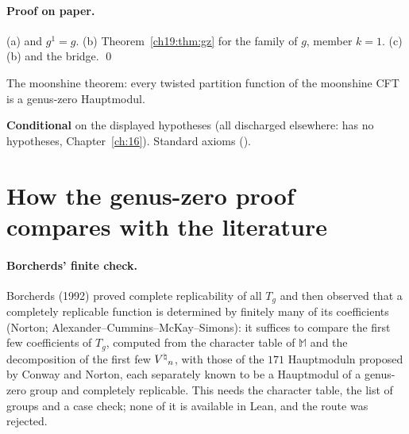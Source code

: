 \paragraph{Proof on paper.}  (a)  and $g^1=g$.  (b) Theorem~\ref{ch19:thm:gz} for the family of $g$, member
$k=1$.  (c) (b) and the bridge. \qed
\begin{physics}The moonshine theorem: every twisted partition function of the moonshine CFT is a genus-zero Hauptmodul.\end{physics}
\begin{status}\textbf{Conditional} on the displayed hypotheses (all discharged elsewhere:  has no hypotheses,
Chapter~\ref{ch:16}).  Standard axioms ().\end{status}

\section{How the genus-zero proof compares with the literature}\label{ch19:sec:compare}

\paragraph{Borcherds' finite check.}  Borcherds (1992) proved complete replicability of all $T_g$ and then observed that a completely
replicable function is determined by finitely many of its coefficients (Norton; Alexander--Cummins--McKay--Simons): it suffices to compare the
first few coefficients of $T_g$, computed from the character table of $\mathbb M$ and the decomposition of the first few ${V^{\natural}}_n$, with
those of the $171$ Hauptmoduln proposed by Conway and Norton, each separately known to be a Hauptmodul of a genus-zero group and
completely replicable.  This needs the character table, the list of groups and a case check; none of it is available in Lean, and the
route was rejected.

